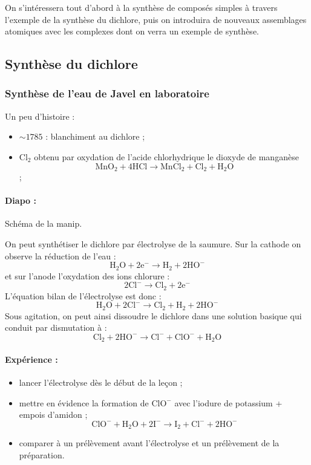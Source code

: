 On s'intéressera tout d'abord à la synthèse de composés simples à travers l'exemple de la synthèse du dichlore, puis on introduira de nouveaux assemblages atomiques avec les complexes dont on verra un exemple de synthèse.

\subsection{Synthèse du dichlore}

\subsubsection{Synthèse de l'eau de Javel en laboratoire}

Un peu d'histoire :
\begin{itemize}
\item $\sim 1785$ : blanchiment au dichlore ;
\item $\mathrm{Cl_2}$ obtenu par oxydation de l'acide chlorhydrique le dioxyde de manganèse $$\mathrm{MnO_2 + 4HCl \rightarrow MnCl_2 + Cl_2 + H_2O}$$;
\end{itemize} 

\paragraph{Diapo : } Schéma de la manip.

On peut synthétiser le dichlore par électrolyse de la saumure.
Sur la cathode on observe la réduction de l'eau :
\begin{equation*}
\mathrm{H_2O + 2e^- \rightarrow H_2 + 2HO^-}
\end{equation*}
et sur l'anode l'oxydation des ions chlorure :
\begin{equation*}
\mathrm{2Cl^- \rightarrow Cl_2 + 2e^-}
\end{equation*}
L'équation bilan de l'électrolyse est donc :
\begin{equation*}
\mathrm{H_2O + 2Cl^- \rightarrow Cl_2 + H_2 + 2HO^-}
\end{equation*}
Sous agitation, on peut ainsi dissoudre le dichlore dans une solution basique qui conduit par dismutation à :
\begin{equation*}
\mathrm{Cl_2 + 2HO^- \rightarrow Cl^- + ClO^- + H_2O} 
\end{equation*}

\paragraph{Expérience : }
\begin{itemize}
\item lancer l'électrolyse dès le début de la leçon ;
\item mettre en évidence la formation de $\mathrm{ClO^-}$ avec l'iodure de potassium + empois d'amidon ;
\begin{equation*}
\mathrm{ClO^- + H_2O + 2I^- \rightarrow I_2 + Cl^- + 2HO^-} 
\end{equation*}
\item comparer à un prélèvement avant l'électrolyse et un prélèvement de la préparation.
\end{itemize}

